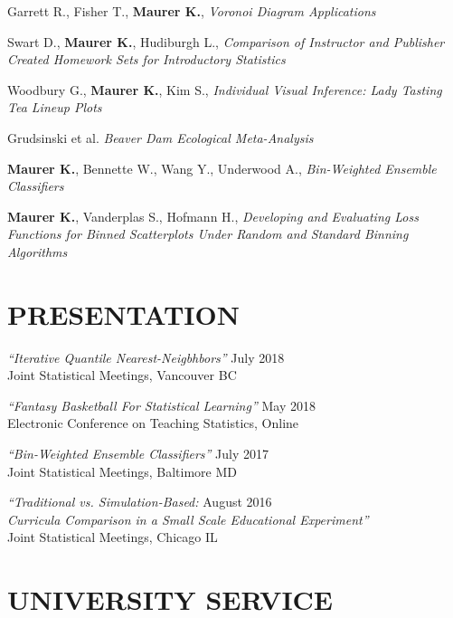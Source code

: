 \documentclass[margin, 10pt]{res}\usepackage[]{graphicx}\usepackage[]{color}
\begin{document}
\begin{resume}
Garrett R., Fisher T., \textbf{Maurer K.}, {\it Voronoi Diagram Applications}

Swart D., \textbf{Maurer K.}, Hudiburgh L., {\it Comparison of Instructor and Publisher Created Homework Sets for Introductory Statistics}  

Woodbury G., \textbf{Maurer K.}, Kim S., {\it Individual Visual Inference: Lady Tasting Tea Lineup Plots}

Grudsinski et al. {\it Beaver Dam Ecological Meta-Analysis}

\textbf{Maurer K.}, Bennette W., Wang Y., Underwood A., {\it Bin-Weighted Ensemble Classifiers}

\textbf{Maurer K.}, Vanderplas S., Hofmann H., {\it Developing and Evaluating Loss Functions for Binned Scatterplots Under Random and Standard Binning Algorithms} 
  
  \section{PRESENTATION}

{\sl ``Iterative Quantile Nearest-Neigbhbors''} \hfill July 2018 \\
Joint Statistical Meetings, Vancouver BC

{\sl ``Fantasy Basketball For Statistical Learning''} \hfill May 2018 \\
Electronic Conference on Teaching Statistics, Online

{\sl ``Bin-Weighted Ensemble Classifiers''} \hfill July 2017 \\
Joint Statistical Meetings, Baltimore MD

{\sl ``Traditional vs. Simulation-Based:} \hfill August 2016 \\
{\sl  Curricula Comparison in a Small Scale Educational Experiment''}\\
Joint Statistical Meetings, Chicago IL

  
  \section{UNIVERSITY SERVICE} 


\end{resume}
\end{document}
